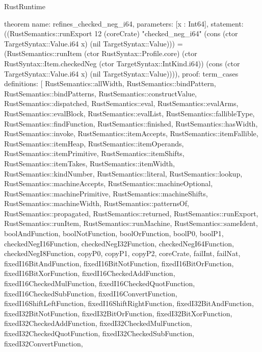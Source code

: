 \begin{lexlean}{RustRuntime}
\begin{semanticmodule}
theorem{
  name: refines_checked_neg_i64,
  parameters: [x : Int64],
  statement: ((RustSemantics::runExport 12 (coreCrate) "checked_neg_i64" (cons (ctor TargetSyntax::Value.i64 x) (nil TargetSyntax::Value))) = (RustSemantics::runItem (ctor RustSyntax::Profile.core) (ctor RustSyntax::Item.checkedNeg (ctor TargetSyntax::IntKind.i64)) (cons (ctor TargetSyntax::Value.i64 x) (nil TargetSyntax::Value)))),
  proof: term_cases{
    definitions: [
      RustSemantics::allWidth,
      RustSemantics::bindPattern,
      RustSemantics::bindPatterns,
      RustSemantics::constructValue,
      RustSemantics::dispatched,
      RustSemantics::eval,
      RustSemantics::evalArms,
      RustSemantics::evalBlock,
      RustSemantics::evalList,
      RustSemantics::fallibleType,
      RustSemantics::findFunction,
      RustSemantics::finished,
      RustSemantics::hasWidth,
      RustSemantics::invoke,
      RustSemantics::itemAccepts,
      RustSemantics::itemFallible,
      RustSemantics::itemHeap,
      RustSemantics::itemOperands,
      RustSemantics::itemPrimitive,
      RustSemantics::itemShifts,
      RustSemantics::itemTakes,
      RustSemantics::itemWidth,
      RustSemantics::kindNumber,
      RustSemantics::literal,
      RustSemantics::lookup,
      RustSemantics::machineAccepts,
      RustSemantics::machineOptional,
      RustSemantics::machinePrimitive,
      RustSemantics::machineShifts,
      RustSemantics::machineWidth,
      RustSemantics::patternsOf,
      RustSemantics::propagated,
      RustSemantics::returned,
      RustSemantics::runExport,
      RustSemantics::runItem,
      RustSemantics::runMachine,
      RustSemantics::sameIdent,
      boolAndFunction,
      boolNotFunction,
      boolOrFunction,
      boolP0,
      boolP1,
      checkedNegI16Function,
      checkedNegI32Function,
      checkedNegI64Function,
      checkedNegI8Function,
      copyP0,
      copyP1,
      copyP2,
      coreCrate,
      failInt,
      failNat,
      fixedI16BitAndFunction,
      fixedI16BitNotFunction,
      fixedI16BitOrFunction,
      fixedI16BitXorFunction,
      fixedI16CheckedAddFunction,
      fixedI16CheckedMulFunction,
      fixedI16CheckedQuotFunction,
      fixedI16CheckedSubFunction,
      fixedI16ConvertFunction,
      fixedI16ShiftLeftFunction,
      fixedI16ShiftRightFunction,
      fixedI32BitAndFunction,
      fixedI32BitNotFunction,
      fixedI32BitOrFunction,
      fixedI32BitXorFunction,
      fixedI32CheckedAddFunction,
      fixedI32CheckedMulFunction,
      fixedI32CheckedQuotFunction,
      fixedI32CheckedSubFunction,
      fixedI32ConvertFunction,
}}
\end{semanticmodule}
\end{lexlean}
